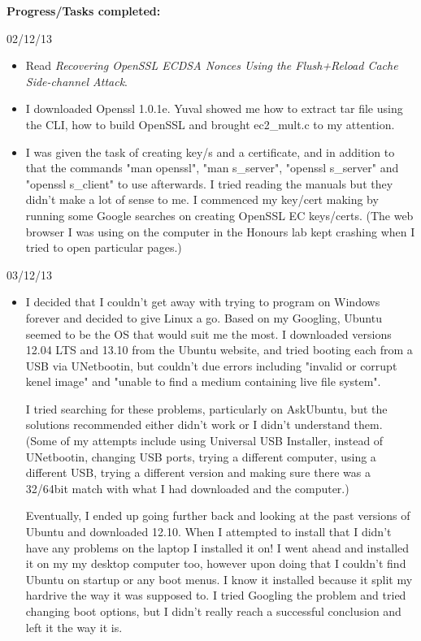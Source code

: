 \documentclass[a4paper, 10pt, envcountsect, runningheads]{article}
\begin{document}
\textbf{Progress/Tasks completed:}

02/12/13 
\begin{itemize}
\item Read \textit{Recovering OpenSSL ECDSA Nonces Using the Flush+Reload Cache Side-channel Attack}. 
\item I downloaded Openssl 1.0.1e. Yuval showed me how to extract tar file using the CLI, how to build OpenSSL and brought ec2\_mult.c to my attention.
\item I was given the task of creating key/s and a certificate, and in addition to that the commands "man openssl", "man s\_server", "openssl s\_server" and "openssl s\_client" to use afterwards. I tried reading the manuals but they didn't make a lot of sense to me. I commenced my key/cert making by running some Google searches on creating OpenSSL EC keys/certs. (The web browser I was using on the computer in the Honours lab kept crashing when I tried to open particular pages.)
\end{itemize}

03/12/13 
\begin{itemize}
\item I decided that I couldn't get away with trying to program on Windows forever and decided to give Linux a go. Based on my Googling, Ubuntu seemed to be the OS that would suit me the most. I downloaded versions 12.04 LTS and 13.10 from the Ubuntu website, and tried booting each from a USB via UNetbootin, but couldn't due errors including "invalid or corrupt kenel image" and "unable to find a medium containing live file system". 

I tried searching for these problems, particularly on AskUbuntu, but the solutions recommended either didn't work or I didn't understand them. (Some of my attempts include using Universal USB Installer, instead of UNetbootin, changing USB ports, trying a different computer, using a different USB, trying a different version and making sure there was a 32/64bit match with what I had downloaded and the computer.) 

Eventually, I ended up going further back and looking at the past versions of Ubuntu and downloaded 12.10. When I attempted to install that I didn't have any problems on the laptop I installed it on! I went ahead and installed it on my my desktop computer too, however upon doing that  I couldn't find Ubuntu on startup or any boot menus. I know it installed because it split my hardrive the way it was supposed to. I tried Googling the problem and tried changing boot options, but I didn't really reach a successful conclusion and left it the way it is.
\end{itemize}
\end{document}
